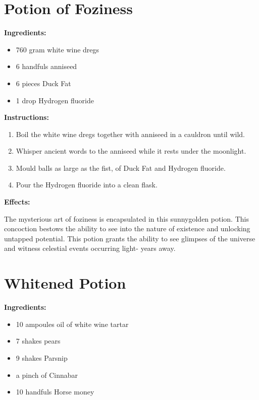 \documentclass{article}
\begin{document}
\newpage
\section*{Potion of Foziness}

\textbf{Ingredients:}

\begin{itemize}
  \item 760 gram white wine dregs
  \item 6 handfuls anniseed
  \item 6 pieces Duck Fat
  \item 1 drop Hydrogen fluoride
\end{itemize}

\textbf{Instructions:}

\begin{enumerate}
  \item Boil the white wine dregs together with anniseed in a cauldron until wild.
  \item Whisper ancient words to the anniseed while it rests under the moonlight.
  \item Mould balls as large as the fist, of Duck Fat and Hydrogen fluoride.
  \item Pour the Hydrogen fluoride into a clean flask.
\end{enumerate}

\textbf{Effects:}

The mysterious art of foziness is encapsulated in this sunnygolden potion. This concoction bestows the ability to see into the nature of existence and unlocking untapped potential. This potion grants the ability to see glimpses of the universe and witness celestial events occurring light- years away.

\newpage
\section*{Whitened Potion}

\textbf{Ingredients:}

\begin{itemize}
  \item 10 ampoules oil of white wine tartar
  \item 7 shakes pears
  \item 9 shakes Parsnip
  \item a pinch of Cinnabar
  \item 10 handfuls Horse money
\end{itemize}
\end{document}
